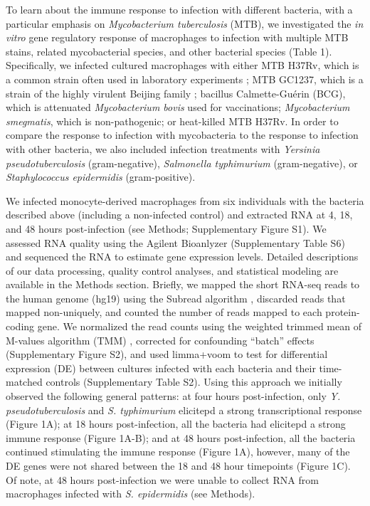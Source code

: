 To learn about the immune response to infection with different bacteria,
with a particular emphasis on \emph{Mycobacterium tuberculosis} (MTB),
we investigated the \emph{in vitro} gene regulatory response of
macrophages to infection with multiple MTB stains, related mycobacterial
species, and other bacterial species (Table 1). Specifically, we
infected cultured macrophages with either MTB H37Rv, which is a common
strain often used in laboratory experiments \citep{Rivero-Lezcano2012};
MTB GC1237, which is a strain of the highly virulent Beijing family
\citep{Alonso2011}; bacillus Calmette-Guérin (BCG), which is attenuated
\emph{Mycobacterium bovis} used for vaccinations; \emph{Mycobacterium
smegmatis}, which is non-pathogenic; or heat-killed MTB H37Rv. In order
to compare the response to infection with mycobacteria to the response
to infection with other bacteria, we also included infection treatments
with \emph{Yersinia pseudotuberculosis} (gram-negative),
\emph{Salmonella typhimurium} (gram-negative), or \emph{Staphylococcus
epidermidis} (gram-positive).

We infected monocyte-derived macrophages from six individuals with the
bacteria described above (including a non-infected control) and
extracted RNA at 4, 18, and 48 hours post-infection (see Methods;
Supplementary Figure S1). We assessed RNA quality using the Agilent
Bioanlyzer (Supplementary Table S6) and sequenced the RNA to estimate
gene expression levels. Detailed descriptions of our data processing,
quality control analyses, and statistical modeling are available in the
Methods section. Briefly, we mapped the short RNA-seq reads to the human
genome (hg19) using the Subread algorithm \citep{Liao2013}, discarded
reads that mapped non-uniquely, and counted the number of reads mapped
to each protein-coding gene. We normalized the read counts using the
weighted trimmed mean of M-values algorithm (TMM) \citep{Robinson2010},
corrected for confounding ``batch'' effects (Supplementary Figure S2),
and used limma+voom \citep{Smyth2004, Smyth2005, Law2014} to test for
differential expression (DE) between cultures infected with each
bacteria and their time-matched controls (Supplementary Table S2). Using
this approach we initially observed the following general patterns: at
four hours post-infection, only \emph{Y. pseudotuberculosis} and
\emph{S. typhimurium} elicitepd a strong transcriptional response (Figure
1A); at 18 hours post-infection, all the bacteria had elicitepd a strong
immune response (Figure 1A-B); and at 48 hours post-infection, all the
bacteria continued stimulating the immune response (Figure 1A), however,
many of the DE genes were not shared between the 18 and 48 hour
timepoints (Figure 1C). Of note, at 48 hours post-infection we were
unable to collect RNA from macrophages infected with \emph{S.
epidermidis} (see Methods).

